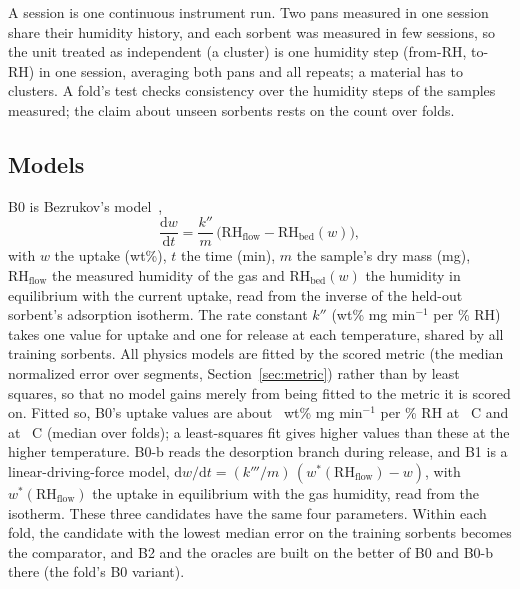 \documentclass[12pt]{article}
\newcommand{\kpp}{k''}
\newcommand{\RHf}{\mathrm{RH}_{\mathrm{flow}}}
\newcommand{\RHb}{\mathrm{RH}_{\mathrm{bed}}}
\begin{document}
A session is one continuous instrument run. Two pans measured in one session share their humidity history, and each
sorbent was measured in few sessions, so the unit treated as independent (a cluster) is one humidity step (from-RH,
to-RH) in one session, averaging both pans and all repeats; a material has  to  clusters.
A fold's test checks consistency over the humidity steps of the samples measured; the claim about unseen sorbents
rests on the count over folds.

\subsection{Models}

B0 is Bezrukov's model~\cite{Bezrukov2023Regeneration},
\begin{equation}
\frac{\mathrm{d}w}{\mathrm{d}t} = \frac{\kpp}{m}\,\bigl(\RHf - \RHb(w)\bigr),
\end{equation}
with $w$ the uptake (wt\%), $t$ the time (min), $m$ the sample's dry mass (mg), $\RHf$ the measured humidity of the
gas and $\RHb(w)$ the humidity in equilibrium with the current uptake, read from the inverse of the held-out sorbent's
adsorption isotherm. The rate constant $\kpp$ (wt\% mg min$^{-1}$ per \% RH) takes one value for uptake and one for
release at each temperature, shared by all training sorbents. All physics models are fitted by the scored metric
(the median normalized error over segments, Section~\ref{sec:metric}) rather than by least squares, so that no model
gains merely from being fitted to the metric it is scored on. Fitted so, B0's uptake values are about
~wt\% mg min$^{-1}$ per \% RH at ~\textdegree C and  at ~\textdegree C (median over folds); a
least-squares fit gives higher values than these at the higher temperature. B0-b reads the desorption branch during
release, and B1 is a linear-driving-force model, $\mathrm{d}w/\mathrm{d}t = (k'''/m)\,(w^{*}(\RHf) - w)$, with
$w^{*}(\RHf)$ the uptake in equilibrium with the gas humidity, read from the isotherm. These three candidates have the
same four parameters. Within each fold, the candidate with the lowest median error on the training sorbents becomes
the comparator, and B2 and the oracles are built on the better of B0 and B0-b there (the fold's B0 variant).
\end{document}
